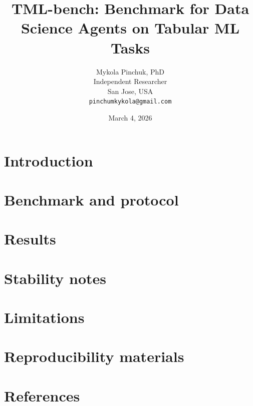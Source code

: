\documentclass[11pt]{article}
\title{TML-bench: Benchmark for Data Science Agents on Tabular ML Tasks}
\author{Mykola Pinchuk, PhD\\Independent Researcher\\San Jose, USA\\\texttt{pinchumkykola@gmail.com}}
\date{March 4, 2026}
\begin{document}
\maketitle

\begin{abstract}

\end{abstract}

\section{Introduction}


\section{Benchmark and protocol}


\section{Results}


\section{Stability notes}


\section{Limitations}


\section{Reproducibility materials}


\section*{References}


\clearpage
\appendix
\clearpage



\end{document}
